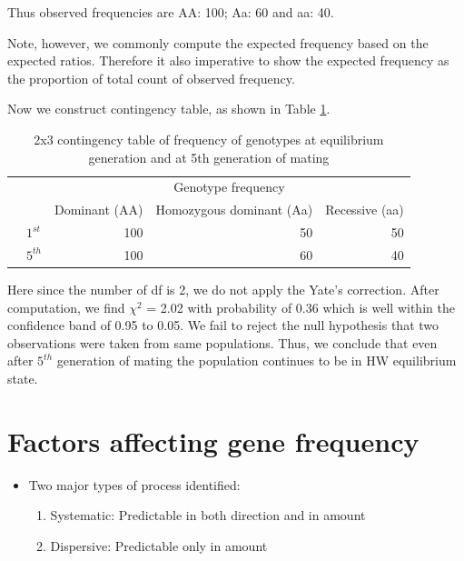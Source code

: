 \documentclass[11pt,dvipsnames,ignorenonframetext,aspectratio=169]{beamer}
\providecommand{\tightlist}{%
  \setlength{\itemsep}{0pt}\setlength{\parskip}{0pt}}
\begin{document}
\begin{frame}{}
\protect\hypertarget{section-20}{}
\footnotesize

Thus observed frequencies are AA: 100; Aa: 60 and aa: 40.

Note, however, we commonly compute the expected frequency based on the
expected ratios. Therefore it also imperative to show the expected
frequency as the proportion of total count of observed frequency.

Now we construct contingency table, as shown in Table
\ref{tab:hw-equilibrium-independence-chi}.

\begingroup\fontsize{8}{10}\selectfont

\begin{longtable}[t]{llrrr}
\caption{\label{tab:hw-equilibrium-independence-chi}2x3 contingency table of frequency of genotypes at equilibrium generation and at 5th generation of mating}\\
\toprule
\multicolumn{2}{c}{  } & \multicolumn{3}{c}{Genotype frequency} \\
\cmidrule(l{3pt}r{3pt}){3-5}
  &   & Dominant (AA) & Homozygous dominant (Aa) & Recessive (aa)\\
\midrule
 & $1^{st}$ & 100 & 50 & 50\\
\cmidrule{2-5}\nopagebreak
\multirow{-2}{*}{\raggedright\arraybackslash Generation} & $5^{th}$ & 100 & 60 & 40\\
\bottomrule
\end{longtable}
\endgroup{}

Here since the number of df is 2, we do not apply the Yate's correction.
After computation, we find \(\chi^2\) = 2.02 with probability of 0.36
which is well within the confidence band of 0.95 to 0.05. We fail to
reject the null hypothesis that two observations were taken from same
populations. Thus, we conclude that even after \(5^{th}\) generation of
mating the population continues to be in HW equilibrium state.
\end{frame}

\hypertarget{factors-affecting-gene-frequency}{%
\section{Factors affecting gene
frequency}\label{factors-affecting-gene-frequency}}

\begin{frame}{}
\protect\hypertarget{section-21}{}
\begin{itemize}
\tightlist
\item
  Two major types of process identified:

  \begin{enumerate}
  \tightlist
  \item
    Systematic: Predictable in both direction and in amount
  \item
    Dispersive: Predictable only in amount
  \end{enumerate}
\end{itemize}
\end{frame}
\end{document}
